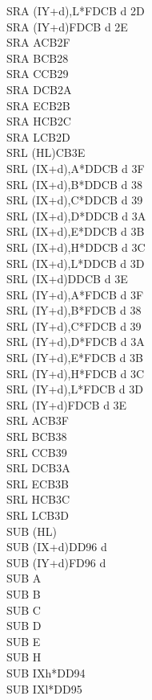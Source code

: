 \documentclass[oneside,a4paper]{book}
\begin{document}
\begin{multicols}{3}
{\begin{tabbing}
SRA (IY+d),L*\>FDCB d 2D\\
SRA (IY+d)\>FDCB d 2E\\
SRA A\>CB2F\\
SRA B\>CB28\\
SRA C\>CB29\\
SRA D\>CB2A\\
SRA E\>CB2B\\
SRA H\>CB2C\\
SRA L\>CB2D\\
SRL (HL)\>CB3E\\
SRL (IX+d),A*\>DDCB d 3F\\
SRL (IX+d),B*\>DDCB d 38\\
SRL (IX+d),C*\>DDCB d 39\\
SRL (IX+d),D*\>DDCB d 3A\\
SRL (IX+d),E*\>DDCB d 3B\\
SRL (IX+d),H*\>DDCB d 3C\\
SRL (IX+d),L*\>DDCB d 3D\\
SRL (IX+d)\>DDCB d 3E\\
SRL (IY+d),A*\>FDCB d 3F\\
SRL (IY+d),B*\>FDCB d 38\\
SRL (IY+d),C*\>FDCB d 39\\
SRL (IY+d),D*\>FDCB d 3A\\
SRL (IY+d),E*\>FDCB d 3B\\
SRL (IY+d),H*\>FDCB d 3C\\
SRL (IY+d),L*\>FDCB d 3D\\
SRL (IY+d)\>FDCB d 3E\\
SRL A\>CB3F\\
SRL B\>CB38\\
SRL C\>CB39\\
SRL D\>CB3A\\
SRL E\>CB3B\\
SRL H\>CB3C\\
SRL L\>CB3D\\
SUB (HL)\\
SUB (IX+d)\>DD96 d\\
SUB (IY+d)\>FD96 d\\
SUB A\\
SUB B\\
SUB C\\
SUB D\\
SUB E\\
SUB H\\
SUB IXh*\>DD94\\
SUB IXl*\>DD95\\

\end{tabbing}}
\end{multicols}
\end{document}
